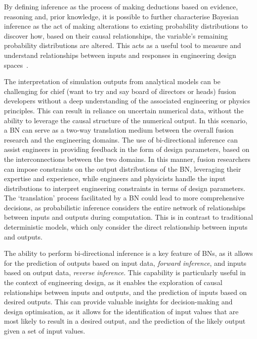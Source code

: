 \documentclass[journal]{IEEEtran}
\begin{document}
By defining inference as the process of making deductions based on evidence, reasoning and, prior knowledge, it is possible to further characterise Bayesian inference as the act of making alterations to existing probability distributions to discover how, based on their causal relationships, the variable's remaining probability distributions are altered. This acts as a useful tool to measure and understand relationships between inputs and responses in engineering design spaces~\cite{Koller2009}. 

The interpretation of simulation outputs from analytical models can be challenging for chief (want to try and say board of directors or heads) fusion developers without a deep understanding of the associated engineering or physics principles. This can result in reliance on uncertain numerical data, without the ability to leverage the causal structure of the numerical output. In this scenario, a BN can serve as a two-way translation medium between the overall fusion research and the engineering domains. The use of bi-directional inference can assist engineers in providing feedback in the form of design parameters, based on the interconnections between the two domains. In this manner, fusion researchers can impose constraints on the output distributions of the BN, leveraging their expertise and experience, while engineers and physicists handle the input distributions to interpret engineering constraints in terms of design parameters. The `translation' process facilitated by a BN could lead to more comprehensive decisions, as probabilistic inference considers the entire network of relationships between inputs and outputs during computation. This is in contrast to traditional deterministic models, which only consider the direct relationship between inputs and outputs. 

The ability to perform bi-directional inference is a key feature of BNs, as it allows for the prediction of outputs based on input data, \textit{forward inference}, and inputs based on output data, \textit{reverse inference}. This capability is particularly useful in the context of engineering design, as it enables the exploration of causal relationships between inputs and outputs, and the prediction of inputs based on desired outputs. This can provide valuable insights for decision-making and design optimisation, as it allows for the identification of input values that are most likely to result in a desired output, and the prediction of the likely output given a set of input values.
\end{document}
